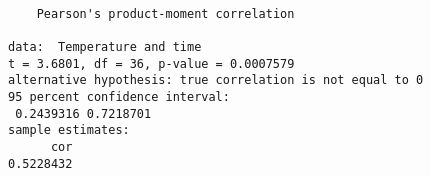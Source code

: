 \begin{verbatim} 

	Pearson's product-moment correlation

data:  Temperature and time
t = 3.6801, df = 36, p-value = 0.0007579
alternative hypothesis: true correlation is not equal to 0
95 percent confidence interval:
 0.2439316 0.7218701
sample estimates:
      cor 
0.5228432 

\end{verbatim}